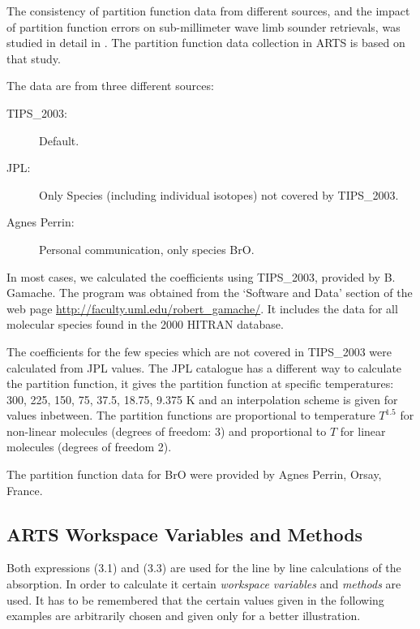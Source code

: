 The consistency of partition function data from different sources, and
the impact of partition function errors on sub-millimeter wave limb
sounder retrievals, was studied in detail in \citet{cverdes:05}. The
partition function data collection in ARTS is based on that study.

The data are from three different sources:
\begin{description}
\item[TIPS\_2003:]  Default.
\item[JPL:] Only Species (including individual isotopes) not covered by TIPS\_2003.
\item[Agnes Perrin:] Personal communication, only species BrO.
\end{description}

In most cases, we calculated the coefficients using TIPS\_2003,
provided by B. Gamache.  The program was obtained from the `Software
and Data' section of the web page
\url{http://faculty.uml.edu/robert_gamache/}.  It includes the data
for all molecular species found in the 2000 HITRAN database.
  
The coefficients for the few species which are not covered in
TIPS\_2003 were calculated from JPL values. The JPL catalogue has a
different way to calculate the partition function, it gives the
partition function at specific temperatures: 300, 225, 150, 75, 37.5,
18.75, 9.375 K and an interpolation scheme is given for values
inbetween. The partition functions are proportional to temperature
$T^1.5$ for non-linear molecules (degrees of freedom: 3) and
proportional to $T$ for linear molecules (degrees of freedom
2).

The partition function data for BrO were provided by Agnes
Perrin, Orsay, France.



\subsection{ARTS Workspace Variables and Methods}

Both expressions (3.1) and (3.3) are used for the line by line
calculations of the absorption. In order to calculate it certain 
{\it workspace variables} and {\it methods} are used. It has to be
remembered that the certain values given in the following examples are
arbitrarily chosen and given only for a better illustration. 


